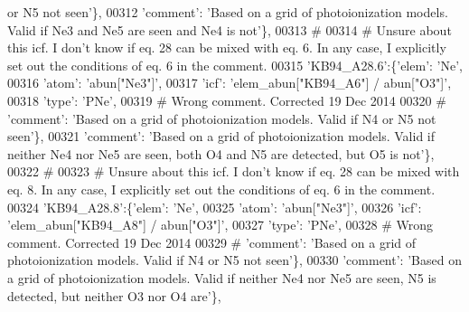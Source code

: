 \begin{DoxyCode}
{       or N5 not seen'\},}
00312                                       \textcolor{stringliteral}{'comment'}: \textcolor{stringliteral}{'Based on a grid of photoionization models. Valid if Ne3
       and Ne5 are seen and Ne4 is not'}\},
00313 \textcolor{comment}{#}
00314 \textcolor{comment}{# Unsure about this icf. I don't know if eq. 28 can be mixed with eq. 6. In any case, I explicitly set out
       the conditions of eq. 6 in the comment.}
00315                          \textcolor{stringliteral}{'KB94\_A28.6'}:\{\textcolor{stringliteral}{'elem'}: \textcolor{stringliteral}{'Ne'},
00316                                        \textcolor{stringliteral}{'atom'}: \textcolor{stringliteral}{'abun["Ne3"]'},
00317                                        \textcolor{stringliteral}{'icf'}: \textcolor{stringliteral}{'elem\_abun["KB94\_A6"]  / abun["O3"]'},
00318                                       \textcolor{stringliteral}{'type'}: \textcolor{stringliteral}{'PNe'},
00319 \textcolor{comment}{# Wrong comment. Corrected 19 Dec 2014}
00320 \textcolor{comment}{#                                      'comment': 'Based on a grid of photoionization models. Valid if N4
       or N5 not seen'\},}
00321                                       \textcolor{stringliteral}{'comment'}: \textcolor{stringliteral}{'Based on a grid of photoionization models. Valid if
       neither Ne4 nor Ne5 are seen, both O4 and N5 are detected, but O5 is not'}\},
00322 \textcolor{comment}{#}
00323 \textcolor{comment}{# Unsure about this icf. I don't know if eq. 28 can be mixed with eq. 8. In any case, I explicitly set out
       the conditions of eq. 6 in the comment.}
00324                          \textcolor{stringliteral}{'KB94\_A28.8'}:\{\textcolor{stringliteral}{'elem'}: \textcolor{stringliteral}{'Ne'},
00325                                      \textcolor{stringliteral}{'atom'}: \textcolor{stringliteral}{'abun["Ne3"]'},
00326                                      \textcolor{stringliteral}{'icf'}: \textcolor{stringliteral}{'elem\_abun["KB94\_A8"]  / abun["O3"]'},
00327                                       \textcolor{stringliteral}{'type'}: \textcolor{stringliteral}{'PNe'},
00328 \textcolor{comment}{# Wrong comment. Corrected 19 Dec 2014}
00329 \textcolor{comment}{#                                      'comment': 'Based on a grid of photoionization models. Valid if N4
       or N5 not seen'\},}
00330                                       \textcolor{stringliteral}{'comment'}: \textcolor{stringliteral}{'Based on a grid of photoionization models. Valid if
       neither Ne4 nor Ne5 are seen, N5 is detected, but neither O3 nor O4 are'}\},

\end{DoxyCode}
